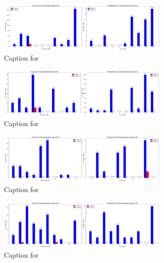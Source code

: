 \documentclass{article}
\begin{document}
\begin{figure}[!htbp]
\centering
\includegraphics[width=0.75\textwidth]{combined_class_boundary_pgd/combined_class_4_misclassifications_eps_0.03.png}
\caption{Caption for }
\label{fig:combined_class_4_misclassifications_eps_0.03.png}
\end{figure}

\begin{figure}[!htbp]
\centering
\includegraphics[width=0.75\textwidth]{combined_class_boundary_pgd/combined_class_5_misclassifications_eps_0.03.png}
\caption{Caption for }
\label{fig:combined_class_5_misclassifications_eps_0.03.png}
\end{figure}

\begin{figure}[!htbp]
\centering
\includegraphics[width=0.75\textwidth]{combined_class_boundary_pgd/combined_class_6_misclassifications_eps_0.03.png}
\caption{Caption for }
\label{fig:combined_class_6_misclassifications_eps_0.03.png}
\end{figure}

\begin{figure}[!htbp]
\centering
\includegraphics[width=0.75\textwidth]{combined_class_boundary_pgd/combined_class_8_misclassifications_eps_0.03.png}
\caption{Caption for }
\label{fig:combined_class_8_misclassifications_eps_0.03.png}
\end{figure}
\end{document}
